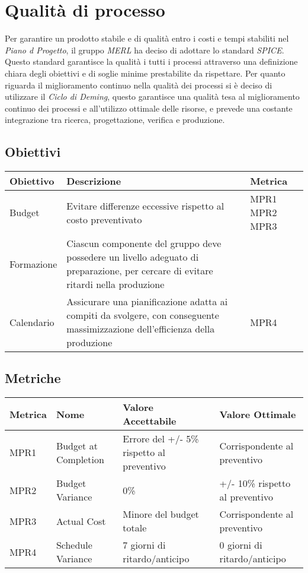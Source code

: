 \chapter{Qualità di processo}
Per garantire un prodotto stabile e di qualità entro i costi e tempi stabiliti nel \textit{Piano d Progetto}, il gruppo \textit{MERL} ha deciso di adottare lo standard \textit{SPICE}. Questo standard garantisce la qualità i tutti i processi attraverso una definizione chiara degli obiettivi e di soglie minime prestabilite da rispettare.
Per quanto riguarda il miglioramento continuo nella qualità dei processi si è deciso di utilizzare il \textit{Ciclo di Deming}, questo garantisce una qualità tesa al miglioramento continuo dei processi e all'utilizzo ottimale delle risorse, e prevede una costante integrazione tra ricerca, progettazione, verifica e produzione.
\section{Obiettivi}
\begin{center}
  \begin{tabular}{|p{2.5cm}|p{8cm}|p{1.5cm}|} \hline
    \textbf{Obiettivo} & \textbf{Descrizione} & \textbf{Metrica}  \\ \hline
    Budget & Evitare differenze eccessive rispetto al costo preventivato & MPR1 \newline MPR2 \newline MPR3     \\ \hline
    Formazione & Ciascun componente del gruppo deve possedere un livello adeguato di preparazione, per cercare di evitare ritardi nella produzione   & \    \\ \hline
    Calendario & Assicurare una pianificazione adatta ai compiti da svolgere, con conseguente massimizzazione dell'efficienza della produzione  & MPR4       \\ \hline
  \end{tabular}
\end{center}
\section{Metriche}
\begin{center}
  \begin{tabular}{|p{2cm}|p{4cm}|p{4cm}|p{3.5cm}|} \hline
    \textbf{Metrica} & \textbf{Nome} & \textbf{Valore Accettabile} & \textbf{Valore Ottimale}    \\ \hline
      MPR1 & Budget at Completion & Errore del +/- 5\% rispetto al preventivo & Corrispondente al preventivo        \\ \hline
      MPR2 & Budget Variance    & 0\%  & +/- 10\% rispetto al preventivo     \\ \hline
      MPR3 & Actual Cost    & Minore del budget totale  & Corrispondente al preventivo     \\ \hline
      MPR4 & Schedule Variance    & 7 giorni di ritardo/anticipo   & 0 giorni di ritardo/anticipo     \\ \hline
  \end{tabular}
\end{center}
